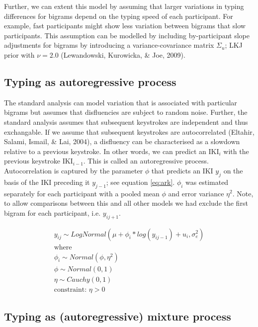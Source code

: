 \documentclass[english,jou,floatsintext]{apa7}
\begin{document}
Further, we can extent this model by assuming that larger variations in typing differences for bigrams depend on the typing speed of each participant. For example, fast participants might show less variation between bigrams that slow participants. This assumption can be modelled by including by-participant slope adjustments for bigrams by introducing a variance-covariance matrix \(\Sigma_u\); LKJ prior with \(\nu=2.0\) (Lewandowski, Kurowicka, \& Joe, 2009).

\hypertarget{typing-as-autoregressive-process}{%
\subsection{Typing as autoregressive process}\label{typing-as-autoregressive-process}}

The standard analysis can model variation that is associated with particular bigrams but assumes that disfluencies are subject to random noise. Further, the standard analysis assumes that subsequent keystrokes are independent and thus exchangable. If we assume that subsequent keystrokes are autocorrelated (Eltahir, Salami, Ismail, \& Lai, 2004), a disfluency can be characterised as a slowdown relative to a previous keystroke. In other words, we can predict an IKI\(_{i}\) with the previous keystroke IKI\(_{i-1}\). This is called an autoregressive process. Autocorrelation is captured by the parameter \(\phi\) that predicts an IKI \(y_j\) on the basis of the IKI preceding it \(y_{j-1}\); see equation \ref{eq:ark}. \(\phi_i\) was estimated separately for each participant with a pooled mean \(\phi\) and error variance \(\eta^2\). Note, to allow comparisons between this and all other models we had exclude the first bigram for each participant, i.e. \(y_{ij+1}\).

\[
\tag{6}
\begin{aligned}
y_{ij} \sim LogNormal(\mu + \phi_i*log(y_{ij-1}) + u_i, \sigma_e^2)\\
\text{where}\\
\phi_i \sim Normal(\phi, \eta^2)\\
\phi \sim Normal(0, 1)\\
\eta \sim Cauchy(0, 1)\\
\text{constraint: }\eta >0 
\end{aligned}
\label{eq:ark}
\]

\hypertarget{typing-as-autoregressive-mixture-process}{%
\subsection{Typing as (autoregressive) mixture process}\label{typing-as-autoregressive-mixture-process}}
\end{document}
